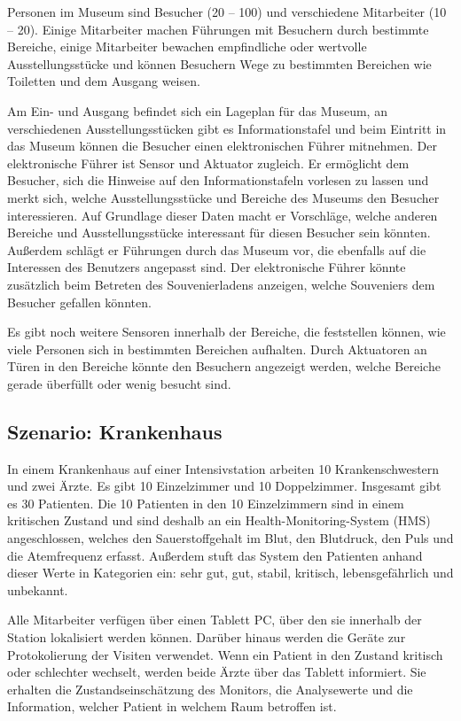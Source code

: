 Personen im Museum sind Besucher (20 – 100) und verschiedene Mitarbeiter (10 – 20). Einige Mitarbeiter machen Führungen mit Besuchern durch bestimmte Bereiche, einige Mitarbeiter bewachen empfindliche oder wertvolle Ausstellungsstücke und können Besuchern Wege zu bestimmten Bereichen wie Toiletten und dem Ausgang weisen.

Am Ein- und Ausgang befindet sich ein Lageplan für das Museum, an verschiedenen Ausstellungsstücken gibt es Informationstafel und beim Eintritt in das Museum können die Besucher einen elektronischen Führer mitnehmen. Der elektronische Führer ist Sensor und Aktuator zugleich. Er ermöglicht dem Besucher, sich die Hinweise auf den Informationstafeln vorlesen zu lassen und merkt sich, welche Ausstellungsstücke und Bereiche des Museums den Besucher interessieren. Auf Grundlage dieser Daten macht er Vorschläge, welche anderen Bereiche und Ausstellungsstücke interessant für diesen Besucher sein könnten. Außerdem schlägt er Führungen durch das Museum vor, die ebenfalls auf die Interessen des Benutzers angepasst sind. Der elektronische Führer könnte zusätzlich beim Betreten des Souvenierladens anzeigen, welche Souveniers dem Besucher gefallen könnten.

Es gibt noch weitere Sensoren innerhalb der Bereiche, die feststellen können, wie viele Personen sich in bestimmten Bereichen aufhalten. Durch Aktuatoren an Türen in den Bereiche könnte den Besuchern angezeigt werden, welche Bereiche gerade überfüllt oder wenig besucht sind.

\subsection*{Szenario: Krankenhaus}

In einem Krankenhaus auf einer Intensivstation arbeiten 10 Krankenschwestern und zwei Ärzte. Es gibt 10 Einzelzimmer und 10 Doppelzimmer. Insgesamt gibt es 30 Patienten. Die 10 Patienten in den 10 Einzelzimmern sind in einem kritischen Zustand und sind deshalb an ein Health-Monitoring-System (HMS) angeschlossen, welches den Sauerstoffgehalt im Blut, den Blutdruck, den Puls und die Atemfrequenz erfasst. Außerdem stuft das System den Patienten anhand dieser Werte in Kategorien ein: sehr gut, gut, stabil, kritisch, lebensgefährlich und unbekannt.

Alle Mitarbeiter verfügen über einen Tablett PC, über den sie innerhalb der Station lokalisiert werden können. Darüber hinaus werden die Geräte zur Protokolierung der Visiten verwendet. Wenn ein Patient in den Zustand kritisch oder schlechter wechselt, werden beide Ärzte über das Tablett informiert. Sie erhalten die Zustandseinschätzung des Monitors, die Analysewerte und die Information, welcher Patient in welchem Raum betroffen ist.

